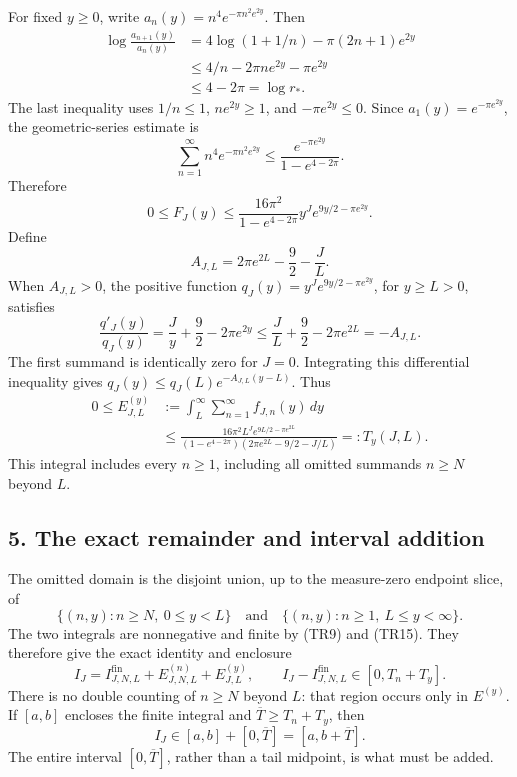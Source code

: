 For fixed \(y\geq0\), write \(a_n(y)=n^4e^{-\pi n^2e^{2y}}\). Then \[
 \begin{aligned}
 \log\frac{a_{n+1}(y)}{a_n(y)}
 &=4\log(1+1/n)-\pi(2n+1)e^{2y}\\
 &\leq4/n-2\pi ne^{2y}-\pi e^{2y}\\
 &\leq4-2\pi=\log r_*.
 \end{aligned}
 \tag{TR10}
\] The last inequality uses \(1/n\leq1\), \(ne^{2y}\geq1\), and \(-\pi e^{2y}\leq0\). Since \(a_1(y)=e^{-\pi e^{2y}}\), the geometric-series estimate is \[
 \sum_{n=1}^{\infty}n^4e^{-\pi n^2e^{2y}}
 \leq\frac{e^{-\pi e^{2y}}}{1-e^{4-2\pi}}.
 \tag{TR11}
\] Therefore \[
 0\leq F_J(y)
 \leq \frac{16\pi^2}{1-e^{4-2\pi}}
 y^Je^{9y/2-\pi e^{2y}}.
 \tag{TR12}
\] Define \[
 A_{J,L}=2\pi e^{2L}-\frac92-\frac JL.
 \tag{TR13}
\] When \(A_{J,L}>0\), the positive function \(q_J(y)=y^Je^{9y/2-\pi e^{2y}}\), for \(y\geq L>0\), satisfies \[
 \frac{q'_J(y)}{q_J(y)}
 =\frac Jy+\frac92-2\pi e^{2y}
 \leq\frac JL+\frac92-2\pi e^{2L}
 =-A_{J,L}.
 \tag{TR14}
\] The first summand is identically zero for \(J=0\). Integrating this differential inequality gives \(q_J(y)\leq q_J(L)e^{-A_{J,L}(y-L)}\). Thus \[
 \begin{aligned}
 0\leq E_{J,L}^{(y)}
 &:=\int_L^\infty\sum_{n=1}^{\infty}f_{J,n}(y)\,dy\\
 &\leq
 \frac{16\pi^2L^Je^{9L/2-\pi e^{2L}}}
 {(1-e^{4-2\pi})(2\pi e^{2L}-9/2-J/L)}
 =:T_y(J,L).
 \end{aligned}
 \tag{TR15}
\] This integral includes every \(n\geq1\), including all omitted summands \(n\geq N\) beyond \(L\).

\subsection{5. The exact remainder and interval addition}\label{the-exact-remainder-and-interval-addition}

The omitted domain is the disjoint union, up to the measure-zero endpoint slice, of \[
 \{(n,y):n\geq N,\ 0\leq y<L\}
 \quad\text{and}\quad
 \{(n,y):n\geq1,\ L\leq y<\infty\}.
 \tag{TR16}
\] The two integrals are nonnegative and finite by (TR9) and (TR15). They therefore give the exact identity and enclosure \[
 I_J=I_{J,N,L}^{\mathrm{fin}}+E_{J,N,L}^{(n)}+E_{J,L}^{(y)},
 \qquad
 I_J-I_{J,N,L}^{\mathrm{fin}}\in[0,T_n+T_y].
 \tag{TR17}
\] There is no double counting of \(n\geq N\) beyond \(L\): that region occurs only in \(E^{(y)}\). If \([a,b]\) encloses the finite integral and \(\overline T\geq T_n+T_y\), then \[
 I_J\in[a,b]+[0,\overline T]=[a,b+\overline T].
 \tag{TR18}
\] The entire interval \([0,\overline T]\), rather than a tail midpoint, is what must be added.

